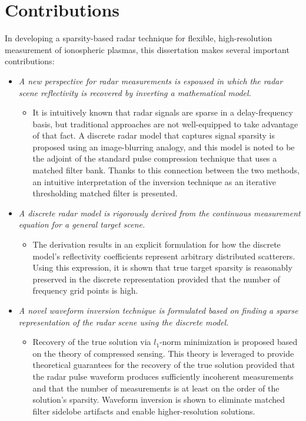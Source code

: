 \section{Contributions}
\label{contributions}
In developing a sparsity-based radar technique for flexible, high-resolution measurement of ionospheric plasmas, this dissertation makes several important contributions:
\begin{itemize}
 \item \emph{A new perspective for radar measurements is espoused in which the radar scene reflectivity is recovered by inverting a mathematical model.}
 \begin{itemize}[]
  \item It is intuitively known that radar signals are sparse in a delay-frequency basis, but traditional approaches are not well-equipped to take advantage of that fact. A discrete radar model that captures signal sparsity is proposed using an image-blurring analogy, and this model is noted to be the adjoint of the standard pulse compression technique that uses a matched filter bank. Thanks to this connection between the two methods, an intuitive interpretation of the inversion technique as an iterative thresholding matched filter is presented.
 \end{itemize}
 \item \emph{A discrete radar model is rigorously derived from the continuous measurement equation for a general target scene.}
 \begin{itemize}[]
  \item The derivation results in an explicit formulation for how the discrete model's reflectivity coefficients represent arbitrary distributed scatterers. Using this expression, it is shown that true target sparsity is reasonably preserved in the discrete representation provided that the number of frequency grid points is high.
 \end{itemize}
 \item \emph{A novel waveform inversion technique is formulated based on finding a sparse representation of the radar scene using the discrete model.}
 \begin{itemize}[]
  \item Recovery of the true solution via $l_1$-norm minimization is proposed based on the theory of compressed sensing. This theory is leveraged to provide theoretical guarantees for the recovery of the true solution provided that the radar pulse waveform produces sufficiently incoherent measurements and that the number of measurements is at least on the order of the solution's sparsity. Waveform inversion is shown to eliminate matched filter sidelobe artifacts and enable higher-resolution solutions.

\end{itemize}
\end{itemize}
